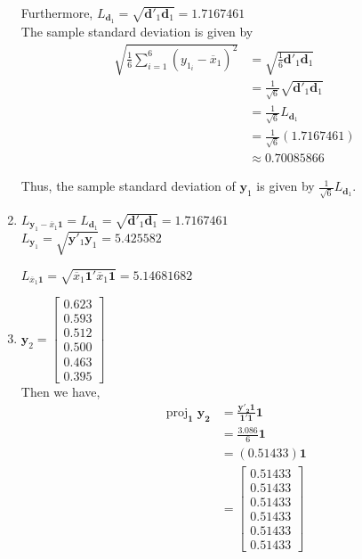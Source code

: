 \documentclass[12pt]{article}
\DeclareMathOperator{\proj}{proj}
\newcommand{\vct}{\mathbf}
\newcommand{\vctproj}[2][]{\proj_{\vct{#1}}\vct{#2}}
\begin{document}
\begin{enumerate}[label=\alph*)]
		Furthermore, $L_{\vct{d}_1} = \sqrt{\vct{d}'_1\vct{d}_1} = 1.7167461$\\
		
		The sample standard deviation is given by 
		\begin{align*}
		\sqrt{\frac{1}{6} \sum_{i = 1}^{6} (y_{1_i} - \overline{x}_1)^2} &= \sqrt{\frac{1}{6} \vct{d}'_1\vct{d}_1}\\
		&= \frac{1}{\sqrt{6}} \sqrt{\vct{d}'_1\vct{d}_1}\\
		&= \frac{1}{\sqrt{6}} L_{\vct{d}_1}\\
		&= \frac{1}{\sqrt{6}}(1.7167461)\\
		&\approx 0.70085866
		\end{align*}
		
		Thus, the sample standard deviation of $\vct{y}_1$ is given by $\frac{1}{\sqrt{6}} L_{\vct{d}_1}$.
	
	\item $L_{\vct{y}_1 - \overline{x}_1\vct{1}} = L_{\vct{d}_1} = \sqrt{\vct{d}'_1\vct{d}_1} = 1.7167461$\\
	
	$L_{\vct{y}_1} = \sqrt{\vct{y}'_1\vct{y}_1} = 5.425582$
	
	$L_{\overline{x}_1\vct{1}} = \sqrt{\overline{x}_1\vct{1}'\overline{x}_1\vct{1}} = 5.14681682$
	
	\item $\vct{y}_2 = \begin{bmatrix}
           0.623 \\
           0.593 \\
           0.512 \\
           0.500 \\
           0.463 \\
           0.395
         \end{bmatrix}$\\
         
         Then we have,
         \begin{align*}
         	\vctproj[1]{y_2} &= \frac{\vct{y'_2}\vct{1}}{\vct{1}'\vct{1}}\vct{1}\\
         	&= \frac{3.086}{6}\vct{1}\\
         	&= (0.51433)\vct{1}\\
         	&= \begin{bmatrix}
           0.51433 \\
           0.51433 \\
           0.51433 \\
           0.51433 \\
           0.51433 \\
           0.51433
         \end{bmatrix}
         \end{align*}
         

\end{enumerate}
\end{document}
